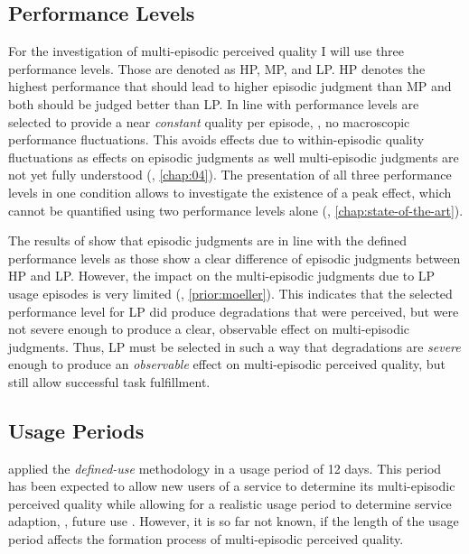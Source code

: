 \subsection{Performance Levels}
For the investigation of multi-episodic perceived quality I will use three performance levels.
Those are denoted as \acf{HP}, \acf{MP}, and \acf{LP}.
\ac{HP} denotes the highest performance that should lead to higher episodic judgment than \ac{MP} and both should be judged better than \ac{LP}.
In line with \citet{moller_single-call_2011} performance levels are selected to provide a near \emph{constant} quality per episode, \ie, no macroscopic performance fluctuations.
This avoids effects due to within-episodic quality fluctuations as effects on episodic judgments as well multi-episodic judgments are not yet fully understood (\cf, \autoref{chap:04}).
The presentation of all three performance levels in one condition allows to investigate the existence of a peak effect, which cannot be quantified using two performance levels alone (\cf, \autoref{chap:state-of-the-art}).

The results of \cite{moller_single-call_2011} show that episodic judgments are in line with the defined performance levels as those show a clear difference of episodic judgments between \ac{HP} and \ac{LP}.
However, the impact on the multi-episodic judgments due to \ac{LP} usage episodes is very limited (\cf, \autoref{prior:moeller}).
This indicates that the selected performance level for \ac{LP} did produce degradations that were perceived, but were not severe enough to produce a clear, observable effect on multi-episodic judgments.
Thus, \ac{LP} must be selected in such a way that degradations are \emph{severe} enough to produce an \emph{observable} effect on multi-episodic perceived quality, but still allow successful task fulfillment.

\subsection{Usage Periods}
\citet{moller_single-call_2011} applied the \emph{defined-use} methodology in a usage period of 12 days. 
This period has been expected to allow new users of a service to determine its multi-episodic perceived quality while allowing for a realistic usage period to determine service adaption, \ie, future use \citep[\cf,][]{moller_single-call_2011}.
However, it is so far not known, if the length of the usage period affects the formation process of multi-episodic perceived quality.

